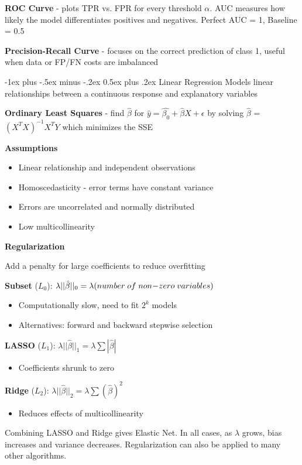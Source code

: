 \documentclass[10pt,landscape]{article}
\makeatletter
\renewcommand{\section}{\@startsection{section}{1}{0mm}%
                                {-1ex plus -.5ex minus -.2ex}%
                                {0.5ex plus .2ex}%
                                {\normalfont\large\bfseries}}
\makeatother
\begin{document}
\begin{multicols}{3}
\textbf{ROC Curve} - plots TPR vs. FPR for every threshold $\alpha$. AUC measures how likely the model differentiates positives and negatives. Perfect AUC = 1, Baseline = 0.5 

\textbf{Precision-Recall Curve} - focuses on the correct prediction of class 1, useful when data or FP/FN costs are imbalanced

\section{Linear Regression}
Models linear relationships between a continuous response and explanatory variables

\textbf{Ordinary Least Squares} - find $\hat{\beta}$ for $\hat{y} = \hat{\beta_{0}} + \hat{\beta}X + \epsilon$ 
by solving $\hat{\beta}$ = $(X^{T}X)^{-1}X^{T}Y$ which minimizes the SSE 

\textbf{Assumptions}
\begin{itemize}[label={--},leftmargin=4mm]
\vspace{-1mm}
\itemsep -.4mm 
\item Linear relationship and independent observations
\item Homoscedasticity - error terms have constant variance
\item Errors are uncorrelated and normally distributed
\item Low multicollinearity
\end{itemize}
\textbf{Regularization} 

Add a penalty for large coefficients to reduce overfitting 

\textbf{Subset}  ($L_0$): $\lambda ||\hat{\beta}||_0 = \lambda (number \;of\;non\hspace{-.7mm}-\hspace{-.7mm}zero\; variables)$ 
\begin{itemize}[label={--},leftmargin=4mm]
\vspace{-1mm}
\itemsep -.4mm 
\item Computationally slow, need to fit $2^k$ models
\item Alternatives: forward and backward stepwise selection
\end{itemize}
\textbf{LASSO}  ($L_1$): $\lambda ||\hat{\beta}||_1 = \lambda\sum | \hat{\beta} |$
\begin{itemize}[label={--},leftmargin=4mm]
\vspace{-1mm}
\itemsep -.4mm 
\item Coefficients shrunk to zero
\end{itemize}
\textbf{Ridge}  ($L_2$): $\lambda ||\hat{\beta}||_2 = \lambda\sum( \hat{\beta})^2$ 
\begin{itemize}[label={--},leftmargin=4mm]
\vspace{-1mm}
\itemsep -.4mm 
\item Reduces effects of multicollinearity
\end{itemize}
Combining LASSO and Ridge gives Elastic Net. In all cases, as $\lambda$ grows, bias increases and variance decreases. Regularization can also be applied to many other algorithms.


\end{multicols}
\end{document}
